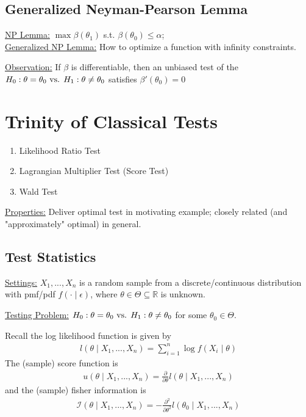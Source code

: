 \documentclass[11pt]{elegantbook}
\begin{document}
\subsection{Generalized Neyman-Pearson Lemma}
\underline{NP Lemma:} $\max\beta(\theta_1)$ s.t. $\beta(\theta_0)\leq \alpha$;\\
\underline{Generalized NP Lemma:} How to optimize a function with infinity constraints.

\underline{Observation:} If $\beta$ is differentiable, then an unbiased test of the $H_0:\theta=\theta_0 \textnormal{ vs. }H_1:\theta\neq \theta_0$ satisfies $\beta'(\theta_0)=0$
\begin{theorem}
    \normalfont
\end{theorem}


\section{Trinity of Classical Tests}
\begin{enumerate}[$\circ$]
    \item Likelihood Ratio Test
    \item Lagrangian Multiplier Test (Score Test)
    \item Wald Test
\end{enumerate}
\underline{Properties:} Deliver optimal test in motivating example; closely related (and "approximately" optimal) in general.

\subsection{Test Statistics}
\underline{Settings:} $X_1,...,X_n$ is a random sample from a discrete/continuous distribution with pmf/pdf $f(\cdot\mid\epsilon)$, where $\theta\in\Theta\subseteq \mathbb{R}$ is unknown.

\underline{Testing Problem:} $H_0:\theta=\theta_0 \textnormal{ vs. }H_1:\theta\neq \theta_0$ for some $\theta_0\in\Theta$.

Recall the log likelihood function is given by
\begin{equation}
    \begin{aligned}
        l(\theta\mid X_1,...,X_n)=\sum_{i=1}^n \log f(X_i\mid \theta)
    \end{aligned}
    \nonumber
\end{equation}
The (sample) score function is
\begin{equation}
    \begin{aligned}
        u(\theta\mid X_1,...,X_n)=\frac{\partial}{\partial \theta}l(\theta\mid X_1,...,X_n)
    \end{aligned}
    \nonumber
\end{equation}
and the (sample) fisher information is
\begin{equation}
    \begin{aligned}
        \mathcal{I}(\theta\mid X_1,...,X_n)=-\frac{\partial^2}{\partial \theta^2}l(\theta_0\mid X_1,...,X_n)
    \end{aligned}
    \nonumber
\end{equation}
\end{document}
